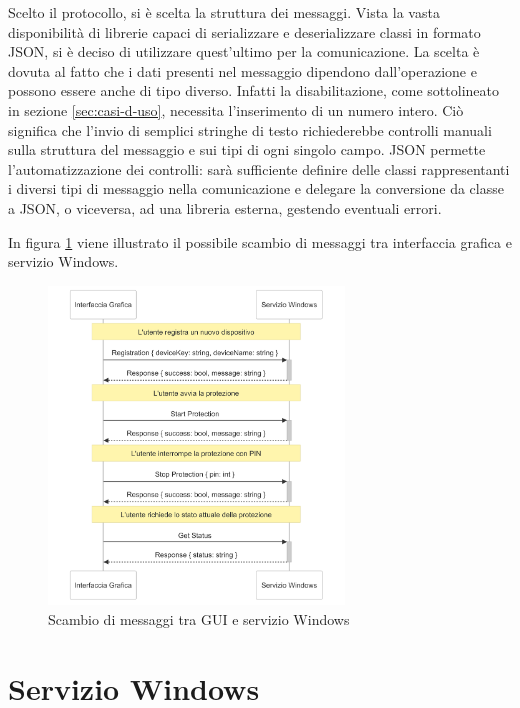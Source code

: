 \documentclass[12pt,a4paper,openright,twoside]{book}
\begin{document}
Scelto il protocollo, si è scelta la struttura dei messaggi.
Vista la vasta disponibilità di librerie capaci di serializzare e deserializzare classi in formato JSON, si è deciso di utilizzare quest'ultimo per la comunicazione.
La scelta è dovuta al fatto che i dati presenti nel messaggio dipendono dall'operazione e possono essere anche di tipo diverso. Infatti la disabilitazione, come sottolineato in sezione \ref{sec:casi-d-uso}, necessita l'inserimento di un numero intero.
Ciò significa che l'invio di semplici stringhe di testo richiederebbe controlli manuali sulla struttura del messaggio e sui tipi di ogni singolo campo.
JSON permette l'automatizzazione dei controlli: sarà sufficiente definire delle classi rappresentanti i diversi tipi di messaggio nella comunicazione e delegare la conversione da classe a JSON, o viceversa, ad una libreria esterna, gestendo eventuali errori.

In figura \ref{fig:schema-messaggi-gui-service} viene illustrato il possibile scambio di messaggi tra interfaccia grafica e servizio Windows.

\begin{figure}[h]
	\centering
	\includegraphics[width=0.7\textwidth]{figures/schema-messaggi-gui-service.png}
	\caption{Scambio di messaggi tra GUI e servizio Windows}
	\label{fig:schema-messaggi-gui-service}
\end{figure}

\section{Servizio Windows}
\end{document}
